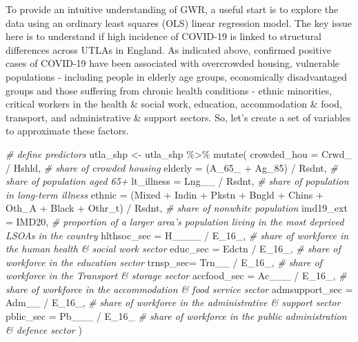 \documentclass[
]{book}
\newenvironment{Shaded}{\begin{snugshade}}{\end{snugshade}}
\newcommand{\AttributeTok}[1]{\textcolor[rgb]{0.77,0.63,0.00}{#1}}
\newcommand{\CommentTok}[1]{\textcolor[rgb]{0.56,0.35,0.01}{\textit{#1}}}
\newcommand{\FunctionTok}[1]{\textcolor[rgb]{0.00,0.00,0.00}{#1}}
\newcommand{\NormalTok}[1]{#1}
\newcommand{\OtherTok}[1]{\textcolor[rgb]{0.56,0.35,0.01}{#1}}
\newcommand{\SpecialCharTok}[1]{\textcolor[rgb]{0.00,0.00,0.00}{#1}}
\begin{document}
To provide an intuitive understanding of GWR, a useful start is to explore the data using an ordinary least squares (OLS) linear regression model. The key issue here is to understand if high incidence of COVID-19 is linked to structural differences across UTLAs in England. As indicated above, confirmed positive cases of COVID-19 have been associated with overcrowded housing, vulnerable populations - including people in elderly age groups, economically disadvantaged groups and those suffering from chronic health conditions - ethnic minorities, critical workers in the health \& social work, education, accommodation \& food, transport, and administrative \& support sectors. So, let's create a set of variables to approximate these factors.

\begin{Shaded}
\begin{Highlighting}[]
\CommentTok{\# define predictors}
\NormalTok{utla\_shp }\OtherTok{\textless{}{-}}\NormalTok{ utla\_shp }\SpecialCharTok{\%\textgreater{}\%} \FunctionTok{mutate}\NormalTok{(}
  \AttributeTok{crowded\_hou =}\NormalTok{ Crwd\_ }\SpecialCharTok{/}\NormalTok{ Hshld, }\CommentTok{\# share of crowded housing}
  \AttributeTok{elderly =}\NormalTok{ (A\_65\_ }\SpecialCharTok{+}\NormalTok{ Ag\_85) }\SpecialCharTok{/}\NormalTok{ Rsdnt, }\CommentTok{\# share of population aged 65+}
  \AttributeTok{lt\_illness =}\NormalTok{ Lng\_\_ }\SpecialCharTok{/}\NormalTok{ Rsdnt, }\CommentTok{\# share of population in long{-}term illness}
  \AttributeTok{ethnic =}\NormalTok{ (Mixed }\SpecialCharTok{+}\NormalTok{ Indin }\SpecialCharTok{+}\NormalTok{ Pkstn }\SpecialCharTok{+}\NormalTok{ Bngld }\SpecialCharTok{+}\NormalTok{ Chins }\SpecialCharTok{+}\NormalTok{ Oth\_A }\SpecialCharTok{+}\NormalTok{ Black }\SpecialCharTok{+}\NormalTok{ Othr\_t) }\SpecialCharTok{/}\NormalTok{ Rsdnt, }\CommentTok{\# share of nonwhite population}
  \AttributeTok{imd19\_ext =}\NormalTok{ IMD20, }\CommentTok{\# proportion of a larger area’s population living in the most deprived LSOAs in the country}
  \AttributeTok{hlthsoc\_sec =}\NormalTok{ H\_\_\_\_ }\SpecialCharTok{/}\NormalTok{ E\_16\_, }\CommentTok{\# share of workforce in the human health \& social work sector}
  \AttributeTok{educ\_sec =}\NormalTok{ Edctn }\SpecialCharTok{/}\NormalTok{ E\_16\_, }\CommentTok{\# share of workforce in the education sector}
  \AttributeTok{trnsp\_sec=}\NormalTok{ Trn\_\_ }\SpecialCharTok{/}\NormalTok{ E\_16\_, }\CommentTok{\# share of workforce in the Transport \& storage sector}
  \AttributeTok{accfood\_sec =}\NormalTok{ Ac\_\_\_ }\SpecialCharTok{/}\NormalTok{ E\_16\_, }\CommentTok{\# share of workforce in the accommodation \& food service sector}
  \AttributeTok{admsupport\_sec =}\NormalTok{ Adm\_\_ }\SpecialCharTok{/}\NormalTok{  E\_16\_, }\CommentTok{\# share of workforce in the administrative \& support sector}
  \AttributeTok{pblic\_sec =}\NormalTok{ Pb\_\_\_ }\SpecialCharTok{/}\NormalTok{ E\_16\_ }\CommentTok{\# share of workforce in the public administration \& defence sector}
\NormalTok{)}
\end{Highlighting}
\end{Shaded}
\end{document}
